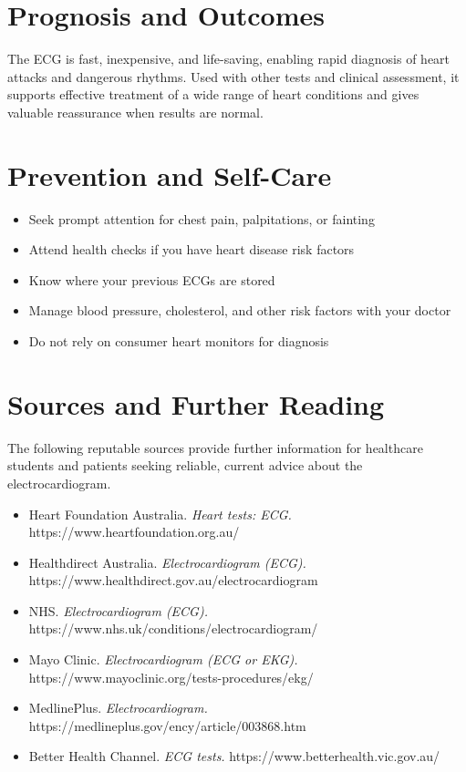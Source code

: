\section*{Prognosis and Outcomes}
The ECG is fast, inexpensive, and life-saving, enabling rapid diagnosis of heart attacks and dangerous rhythms. Used with other tests and clinical assessment, it supports effective treatment of a wide range of heart conditions and gives valuable reassurance when results are normal.

\section*{Prevention and Self-Care}
\begin{itemize}
    \item Seek prompt attention for chest pain, palpitations, or fainting
    \item Attend health checks if you have heart disease risk factors
    \item Know where your previous ECGs are stored
    \item Manage blood pressure, cholesterol, and other risk factors with your doctor
    \item Do not rely on consumer heart monitors for diagnosis
\end{itemize}

\section*{Sources and Further Reading}
The following reputable sources provide further information for healthcare students and patients seeking reliable, current advice about the electrocardiogram.
\begin{itemize}
    \item Heart Foundation Australia. \textit{Heart tests: ECG.} https://www.heartfoundation.org.au/
    \item Healthdirect Australia. \textit{Electrocardiogram (ECG).} https://www.healthdirect.gov.au/electrocardiogram
    \item NHS. \textit{Electrocardiogram (ECG).} https://www.nhs.uk/conditions/electrocardiogram/
    \item Mayo Clinic. \textit{Electrocardiogram (ECG or EKG).} https://www.mayoclinic.org/tests-procedures/ekg/
    \item MedlinePlus. \textit{Electrocardiogram.} https://medlineplus.gov/ency/article/003868.htm
    \item Better Health Channel. \textit{ECG tests.} https://www.betterhealth.vic.gov.au/
\end{itemize}
